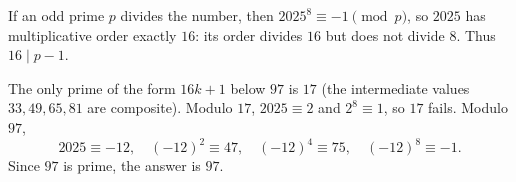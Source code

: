 If an odd prime $p$ divides the number, then $2025^8\equiv-1\pmod p$, so $2025$ has multiplicative order exactly $16$: its order divides $16$ but does not divide $8$. Thus $16\mid p-1$.

The only prime of the form $16k+1$ below $97$ is $17$ (the intermediate values $33,49,65,81$ are composite). Modulo $17$, $2025\equiv2$ and $2^8\equiv1$, so $17$ fails. Modulo $97$,
\[
2025\equiv-12,\quad (-12)^2\equiv47,\quad (-12)^4\equiv75,\quad (-12)^8\equiv-1.
\]
Since $97$ is prime, the answer is $\boxed{97}$.
